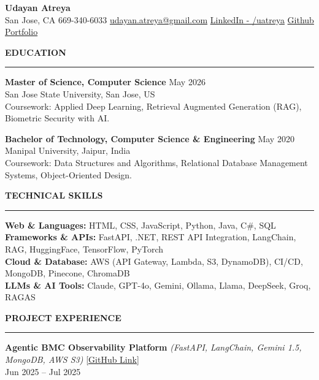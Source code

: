 \documentclass[letterpaper,10.5pt]{extarticle}
\newcommand{\resumesection}[1]{%
    \vspace{6pt}%
    \noindent\textbf{#1}\vspace{-5pt}%
    \\\noindent\rule{\textwidth}{0.5pt}%
    \vspace{1pt}%
}
\begin{document}
\begin{center}
    {\LARGE\textbf{Udayan Atreya}}\\[3pt]
    {\fontsize{11}{13.2}\selectfont
    San Jose, CA \textbar{} 669-340-6033 \textbar{}
    \href{mailto:udayan.atreya@gmail.com}{udayan.atreya@gmail.com} \textbar{}
    \href{https://www.linkedin.com/in/uatreya/}{LinkedIn - /uatreya} \textbar{}
    \href{https://github.com/slowloris-98/}{Github} \textbar{}
    \href{https://udayan-atreya.vercel.app/}{Portfolio}}
\end{center}

\resumesection{EDUCATION}

\noindent\textbf{Master of Science, Computer Science} \hfill May 2026\\
San Jose State University, San Jose, US\\
Coursework: Applied Deep Learning, Retrieval Augmented Generation (RAG), Biometric Security with AI.

\vspace{5pt}

\noindent\textbf{Bachelor of Technology, Computer Science \& Engineering} \hfill May 2020\\
Manipal University, Jaipur, India\\
Coursework: Data Structures and Algorithms, Relational Database Management Systems, Object-Oriented Design.

\resumesection{TECHNICAL SKILLS}

\noindent\textbf{Web \& Languages:} HTML, CSS, JavaScript, Python, Java, C\#, SQL\\
\noindent\textbf{Frameworks \& APIs:} FastAPI, .NET, REST API Integration, LangChain, RAG, HuggingFace, TensorFlow, PyTorch\\
\noindent\textbf{Cloud \& Database:} AWS (API Gateway, Lambda, S3, DynamoDB), CI/CD, MongoDB, Pinecone, ChromaDB\\
\noindent\textbf{LLMs \& AI Tools:} Claude, GPT-4o, Gemini, Ollama, Llama, DeepSeek, Groq, RAGAS

\resumesection{PROJECT EXPERIENCE}

\noindent\textbf{Agentic BMC Observability Platform}
\textit{(FastAPI, LangChain, Gemini 1.5, MongoDB, AWS S3)} \hfill \href{https://github.com/slowloris-98/Agentic-Oberservability-BMC}{[GitHub Link]} \\
Jun 2025 -- Jul 2025
\end{document}
